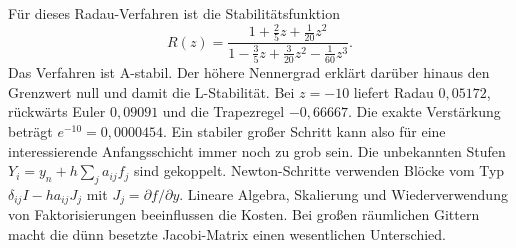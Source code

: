Für dieses Radau-Verfahren ist die Stabilitätsfunktion
\[
 R(z)=\frac{1+\frac25z+\frac1{20}z^2}
 {1-\frac35z+\frac3{20}z^2-\frac1{60}z^3}.
\]
Das Verfahren ist A-stabil. Der höhere Nennergrad erklärt darüber hinaus den Grenzwert null und damit die L-Stabilität. Bei \(z=-10\) liefert Radau \(0{,}05172\), rückwärts Euler \(0{,}09091\) und die Trapezregel \(-0{,}66667\). Die exakte Verstärkung beträgt \(e^{-10}=0{,}0000454\). Ein stabiler großer Schritt kann also für eine interessierende Anfangsschicht immer noch zu grob sein.
Die unbekannten Stufen \(Y_i=y_n+h\sum_j a_{ij}f_j\) sind gekoppelt. Newton-Schritte verwenden Blöcke vom Typ \(\delta_{ij}I-h a_{ij}J_j\) mit \(J_j=\partial f/\partial y\). Lineare Algebra, Skalierung und Wiederverwendung von Faktorisierungen beeinflussen die Kosten. Bei großen räumlichen Gittern macht die dünn besetzte Jacobi-Matrix einen wesentlichen Unterschied.

